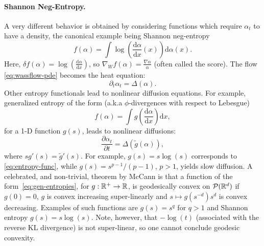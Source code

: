 \paragraph{Shannon Neg-Entropy.} A very different behavior is obtained by considering functions which require $\alpha_t$ to have a density, the canonical example being Shannon neg-entropy
   \begin{equation}
       f(\alpha) = \int \log\left(\frac{\mathrm{d} \alpha}{\mathrm{d} x}(x)\right) \mathrm{d} \alpha(x). \label{eq:entropy-func}
   \end{equation}
   Here, $\delta f(\alpha) = \log\left(\frac{\mathrm{d} \alpha}{\mathrm{d} x}\right)$, so $\nabla_W f(\alpha) = \frac{\nabla \alpha}{\alpha}$ (often called the score). The flow \eqref{eq:wassflow-pde} becomes the heat equation:
   \begin{equation*}
       \partial_t \alpha_t = \Delta(\alpha).
   \end{equation*}
   Other entropy functionals lead to nonlinear diffusion equations. For example, generalized entropy of the form (a.k.a $\phi$-divergences with respect to Lebesgue)
   \begin{equation}\label{eq:gen-entropies}
       f(\alpha) = \int g\left(\frac{\mathrm{d} \alpha}{\mathrm{d} x}\right) \mathrm{d} x,
   \end{equation}
   for a 1-D function $g(s)$, leads to nonlinear diffusions:
   \begin{equation*}
       \frac{\partial \alpha_t}{\partial t} = \Delta(\tilde{g}(\alpha)),
   \end{equation*}
   where $s g'(s) = \tilde{g}'(s)$. For example, $g(s) = s \log(s)$ corresponds to \eqref{eq:entropy-func}, while $g(s) = s^{p-1}/(p-1)$, $p > 1$, yields slow diffusion.
	A celebrated, and non-trivial, theorem by McCann is that a function of the form~\eqref{eq:gen-entropies}, for $g : \mathbb{R}^+ \to \mathbb{R}$, is geodesically convex on $\mathcal{P}(\mathbb{R}^d)$ if $g(0)=0$, $g$ is convex increasing super-linearly and $s \mapsto g(s^{-d}) s^d$ is convex decreasing.
	Examples of such functions are $g(s)=s^q$ for $q>1$ and Shannon entropy $g(s)=s \log(s)$. %
	Note, however, that $-\log(t)$ (associated with the reverse KL divergence) is not super-linear, so one cannot conclude geodesic convexity. 
	
